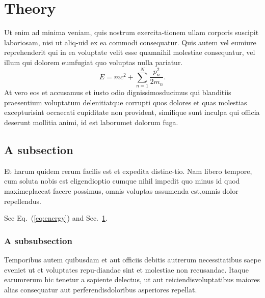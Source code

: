 \documentclass[reprint,aps,pra,superscriptaddress,10pt,nofootinbib,nobalancelastpage,linenumbers]{revtex4-2}
\begin{document}
\section{Theory}\label{sec:theory}
Ut enim ad minima veniam, quis nostrum exercita-\linebreak tionem ullam corporis suscipit laboriosam, nisi ut aliq-\linebreak uid ex ea commodi consequatur. Quis autem vel eum\linebreak iure reprehenderit qui in ea voluptate velit esse quam\linebreak nihil molestiae consequatur, vel illum qui dolorem eum\linebreak fugiat quo voluptas nulla pariatur.
\begin{equation}
E = m c^2 + \sum_{n=1}^{N} \frac{p_n^2}{2 m_n} .
\label{eq:energy}
\end{equation}
At vero eos et accusamus et iusto odio dignissimos\linebreak ducimus qui blanditiis praesentium voluptatum deleniti\linebreak atque corrupti quos dolores et quas molestias excepturi\linebreak sint occaecati cupiditate non provident, similique sunt in\linebreak culpa qui officia deserunt mollitia animi, id est laborum\linebreak et dolorum fuga.

\subsection{A subsection}
Et harum quidem rerum facilis est et expedita distinc-\linebreak tio. Nam libero tempore, cum soluta nobis est eligendi\linebreak optio cumque nihil impedit quo minus id quod maxime\linebreak placeat facere possimus, omnis voluptas assumenda est,\linebreak omnis dolor repellendus.

See Eq.~(\ref{eq:energy}) and Sec.~\ref{sec:theory}.

\subsubsection{A subsubsection}
Temporibus autem quibusdam et aut officiis debitis aut\linebreak rerum necessitatibus saepe eveniet ut et voluptates repu-\linebreak diandae sint et molestiae non recusandae. Itaque earum\linebreak rerum hic tenetur a sapiente delectus, ut aut reiciendis\linebreak voluptatibus maiores alias consequatur aut perferendis\linebreak doloribus asperiores repellat.
\end{document}

